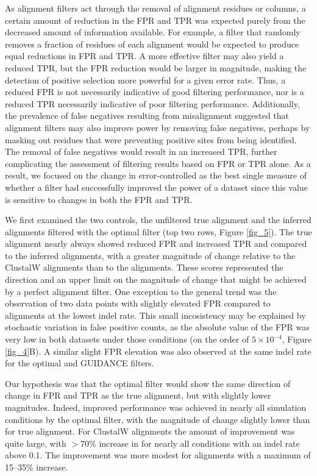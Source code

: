 \documentclass{mbe}
\begin{document}
As alignment filters act through the removal of alignment residues or
columns, a certain amount of reduction in the FPR and TPR was expected
purely from the decreased amount of information available. For
example, a filter that randomly removes a fraction of residues of each
alignment would be expected to produce equal reductions in FPR and
TPR. A more effective filter may also yield a reduced TPR, but the FPR
reduction would be larger in magnitude, making the detection of
positive selection more powerful for a given error rate. Thus, a
reduced FPR is not necessarily indicative of good filtering
performance, nor is a reduced TPR necessarily indicative of poor
filtering performance. Additionally, the prevalence of false negatives
resulting from misalignment suggested that alignment filters may also
improve power by removing false negatives, perhaps by masking out
residues that were preventing positive sites from being
identified. The removal of false negatives would result in an
increased TPR, further complicating the assessment of filtering
results based on FPR or TPR alone. As a result, we focused on the
change in error-controlled \tpr{} as the best single measure of
whether a filter had successfully improved the \sw power of a dataset
since this value is sensitive to changes in both the FPR and TPR.

We first examined the two controls, the unfiltered true alignment and
the inferred alignments filtered with the optimal filter (top two
rows, Figure \ref{fig_5}). The true alignment nearly always showed
reduced FPR and increased TPR and \tpr compared to the inferred
alignments, with a greater magnitude of change relative to the
ClustalW alignments than to the \prankc alignments. These scores
represented the direction and an upper limit on the magnitude of
change that might be achieved by a perfect alignment filter. One
exception to the general trend was the observation of two data points
with slightly elevated FPR compared to \prankc alignments at the
lowest indel rate. This small incosistency may be explained by
stochastic variation in false positive counts, as the absolute value
of the FPR was very low in both datasets under those conditions (on
the order of $5\times10^{-4}$, Figure \ref{fig_4}B). A similar slight FPR
elevation was also observed at the same indel rate for the optimal and
GUIDANCE filters.

Our hypothesis was that the optimal filter would show the same
direction of change in FPR and TPR as the true alignment, but with
slightly lower magnitudes. Indeed, improved \sw performance was
achieved in nearly all simulation conditions by the optimal filter,
with the magnitude of \tpr change slightly lower than for true
alignment. For ClustalW alignments the amount of improvement was quite
large, with $>$70\% increase in \tpr for nearly all conditions with an
indel rate above 0.1. The improvement was more modest for \prankc
alignments with a maximum of 15--35\% \tpr increase.
\end{document}
